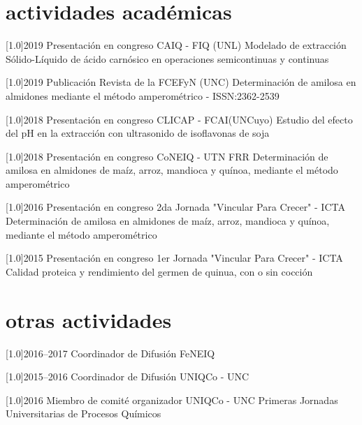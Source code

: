 \documentclass[espanol]{cv-style}     %
\begin{document}
\section{actividades académicas}
\begin{entrylist}
\entry
{\scalebox{.8}[1.0]{2019}}
{Presentación en congreso}
{CAIQ - FIQ (UNL)}
{\small{Modelado de extracción Sólido-Líquido de ácido carnósico en operaciones semicontinuas y continuas}}

\entry
{\scalebox{.8}[1.0]{2019}}
{Publicación}
{Revista de la FCEFyN (UNC)}
{\small{Determinación de amilosa en almidones mediante el método amperométrico - ISSN:2362-2539}}

\entry
{\scalebox{.8}[1.0]{2018}}
{Presentación en congreso}
{CLICAP - FCAI(UNCuyo)}
{\small{Estudio del efecto del pH en la extracción con ultrasonido de isoflavonas de soja}}

\entry
{\scalebox{.8}[1.0]{2018}}
{Presentación en congreso}
{CoNEIQ - UTN FRR}
{\small{Determinación de amilosa en almidones de maíz, arroz, mandioca y quínoa, mediante el método amperométrico}}

\entry
{\scalebox{.8}[1.0]{2016}}
{Presentación en congreso}
{2da Jornada "Vincular Para Crecer" - ICTA}
{\small{Determinación de amilosa en almidones de maíz, arroz, mandioca y quínoa, mediante el método amperométrico}}

\entry
{\scalebox{.8}[1.0]{2015}}
{Presentación en congreso}
{1er Jornada "Vincular Para Crecer" - ICTA}
{\small{Calidad proteica y rendimiento del germen de quinua, con o sin cocción}}
\end{entrylist}




\section{otras actividades}
  \vspace{-0.2cm}
\begin{entrylist}
\entry
{\scalebox{.8}[1.0]{2016--2017}}
{Coordinador de Difusión}
{FeNEIQ}
{}

\entry
{\scalebox{.8}[1.0]{2015--2016}}
{Coordinador de Difusión}
{UNIQCo - UNC}
{}

\entry
{\scalebox{.8}[1.0]{2016}}
{Miembro de comité organizador}
{UNIQCo - UNC}
{Primeras Jornadas Universitarias de Procesos Químicos}

\end{entrylist}
\end{document}
